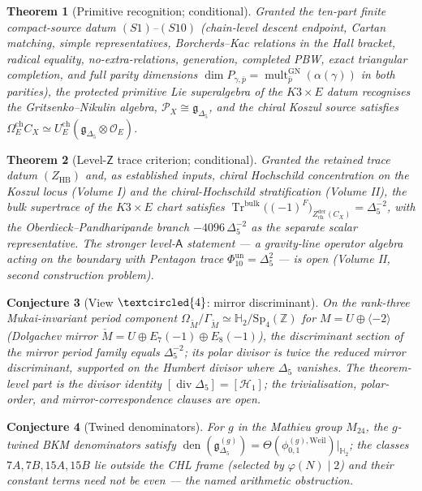\documentclass[11pt]{article}
\providecommand{\cO}{\mathcal{O}}
\providecommand{\cP}{\mathcal{P}}
\providecommand{\bZ}{\mathbb{Z}}
\providecommand{\bH}{\mathbb{H}}
\providecommand{\fg}{\mathfrak{g}}
\providecommand{\Zder}{Z^{\mathrm{der}}_{\mathrm{ch}}}
\providecommand{\Dfive}{\Delta_5}
\providecommand{\Phiten}{\Phi_{10}}
\providecommand{\Tr}{\operatorname{Tr}}
\providecommand{\dend}{\operatorname{den}}
\providecommand{\Sp}{\mathrm{Sp}}
\providecommand{\HypPlan}{U}
\newtheorem{theorem}{Theorem}[section]
\newtheorem{conjecture}[theorem]{Conjecture}
\begin{document}
\begin{theorem}[Primitive recognition; conditional]\label{thm:recog}
Granted the ten-part finite compact-source datum $(S1)$--$(S10)$
\textup{(chain-level descent endpoint, Cartan matching, simple
representatives, Borcherds--Kac relations in the Hall bracket,
radical equality, no-extra-relations, generation, completed PBW,
exact triangular completion, and full parity dimensions
$\dim P_{\gamma,\bar p}=\operatorname{mult}^{\mathrm{GN}}_{\bar p}
(\alpha(\gamma))$ in both parities}\textup),
the protected primitive Lie superalgebra of the $K3\times E$ datum
recognises the Gritsenko--Nikulin algebra,
$\cP_X\cong\fg_{\Dfive}$, and the chiral Koszul source satisfies
$\Omega^{\mathrm{ch}}_E C_X\simeq
U^{\mathrm{ch}}_E(\fg_{\Dfive}\otimes\cO_E)$.
\end{theorem}

\begin{theorem}[Level-$\mathsf Z$ trace criterion; conditional]
\label{thm:trace}
Granted the retained trace datum $(Z_{\mathrm{HB}})$ and, as
established inputs, chiral Hochschild concentration on the Koszul
locus \textup{(Volume I)} and the chiral-Hochschild stratification
\textup{(Volume II)}, the bulk supertrace of the $K3\times E$ chart
satisfies
$\Tr^{\mathrm{bulk}}\bigl((-1)^F\bigr)_{\Zder(C_X)}=\Dfive^{-2}$, with
the Oberdieck--Pandharipande branch $-4096\,\Dfive^{-2}$ as the
separate scalar representative. The stronger level-$\mathsf A$
statement --- a gravity-line operator algebra acting on the boundary
with Pentagon trace $\Phiten^{\mathrm{un}}=\Dfive^2$ --- is open
\textup{(Volume II, second construction problem)}.
\end{theorem}

\begin{conjecture}[View $\textcircled{4}$: mirror discriminant]
\label{conj:mirror}
On the rank-three Mukai-invariant period component
$\Omega_{\widetilde M}/\Gamma_{\widetilde M}\simeq\bH_2/\Sp_4(\bZ)$
for $M=\HypPlan\oplus\langle-2\rangle$ \textup{(Dolgachev mirror
$\check M=\HypPlan\oplus E_7(-1)\oplus E_8(-1)$)}, the discriminant
section of the mirror period family equals $\Dfive^{-2}$; its polar
divisor is twice the reduced mirror discriminant, supported on the
Humbert divisor where $\Dfive$ vanishes. The theorem-level part is
the divisor identity $[\operatorname{div}\Dfive]=[\mathcal H_1]$; the
trivialisation, polar-order, and mirror-correspondence clauses are
open.
\end{conjecture}

\begin{conjecture}[Twined denominators]\label{conj:twined}
For $g$ in the Mathieu group $M_{24}$, the $g$-twined BKM denominators
satisfy $\dend(\fg^{(g)}_{\Dfive})
=\Theta(\phi^{(g),\mathrm{Weil}}_{0,1})|_{\bH_2}$; the classes
$7A,7B,15A,15B$ lie outside the CHL frame
\textup{(selected by $\varphi(N)\mid2$)} and their constant terms
need not be even --- the named arithmetic obstruction.
\end{conjecture}
\end{document}
